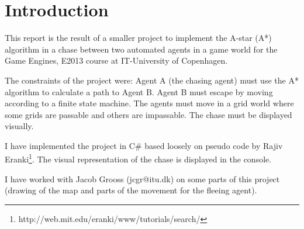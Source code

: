 \section{Introduction}
\label{Intro}
This report is the result of a smaller project to implement the A-star (A*) algorithm in a chase between two automated agents in a game world for the Game Engines, E2013 course at IT-University of Copenhagen.

The constraints of the project were: Agent A (the chasing agent) must use the A* algorithm to calculate a path to Agent B. Agent B must escape by moving according to a finite state machine. The agents must move in a grid world where some grids are passable and others are impassable. The chase must be displayed visually.

I have implemented the project in C\# based loosely on pseudo code by Rajiv Eranki\footnote{http://web.mit.edu/eranki/www/tutorials/search/}. The visual representation of the chase is displayed in the console.

I have worked with Jacob Grooss (jcgr@itu.dk) on some parts of this project (drawing of the map and parts of the movement for the fleeing agent).